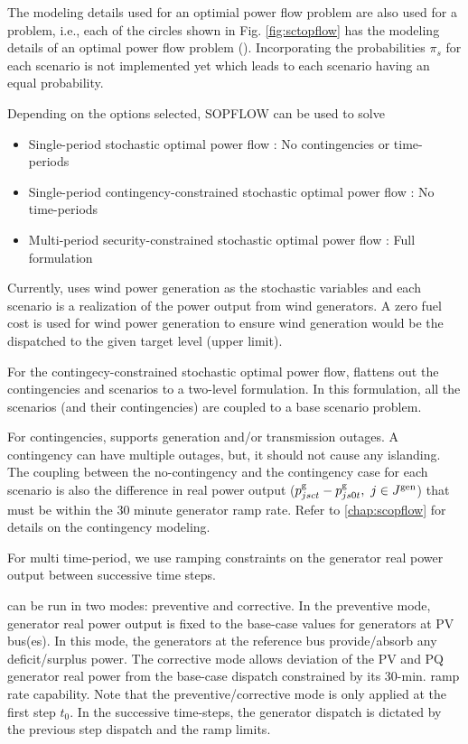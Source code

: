 The modeling details used for an optimial power flow problem are also used for a {\sopflow} problem, i.e., each of the circles shown in Fig. \ref{fig:sctopflow} has the modeling details of an optimal power flow problem (\opflow). Incorporating the probabilities $\pi_s$ for each scenario is not implemented yet which leads to each scenario having an equal probability. 

Depending on the options selected, SOPFLOW can be used to solve 
\begin{itemize}
    \item Single-period stochastic optimal power flow : No contingencies or time-periods
    \item Single-period contingency-constrained stochastic optimal power flow : No time-periods
    \item Multi-period security-constrained stochastic optimal power flow : Full formulation
\end{itemize}

Currently, \sopflow uses wind power generation as the stochastic variables and each scenario is a realization of the power output from wind generators. A zero fuel cost is used for wind power generation to ensure wind generation would be the dispatched to the given target level (upper limit). 

For the contingecy-constrained stochastic optimal power flow, \sopflow flattens out the contingencies and scenarios to a two-level formulation. In this formulation, all the scenarios (and their contingencies) are coupled to a base scenario problem.

For contingencies, \sopflow supports generation and/or transmission outages. A contingency can have multiple outages, but, it should not cause any islanding. The coupling between the no-contingency and the contingency case for each scenario is also the difference in real power output ($p_{jsct}^{\text{g}} - p_{js0t}^{\text{g}},~ j \in J^\text{gen}$) that must be within the 30 minute generator ramp rate. Refer to \ref{chap:scopflow} for details on the contingency modeling.

For multi time-period, we use ramping constraints on the generator real power output between successive time steps.

\sopflow can be run in two modes: preventive and corrective. In the preventive mode, generator real power output is fixed to the base-case values for generators at PV bus(es). In this mode, the generators at the reference bus provide/absorb any deficit/surplus power. The corrective mode allows deviation of the PV and PQ generator real power from the base-case dispatch constrained by its 30-min. ramp rate capability. Note that the preventive/corrective mode is only applied at the first step $t_0$. In the successive time-steps, the generator dispatch is dictated by the previous step dispatch and the ramp limits.

